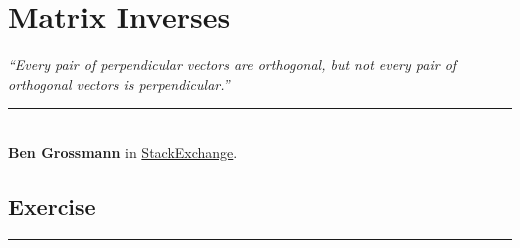 \chapter{Matrix Inverses}\label{chp:matinv}


\begin{flushright}
\textit{``Every pair of perpendicular vectors are orthogonal, but not every pair of orthogonal vectors is perpendicular.''}\\
\rule{0.5\textwidth}{.4pt}\\
\textbf{Ben Grossmann} \small{in \href{https://math.stackexchange.com/questions/2326896/about-perpendicular-vectors}{StackExchange}.}
\end{flushright}


\section{Exercise}
\vspace{-0.5cm}
\begin{center}
    \rule{\textwidth}{1pt}
\end{center}

